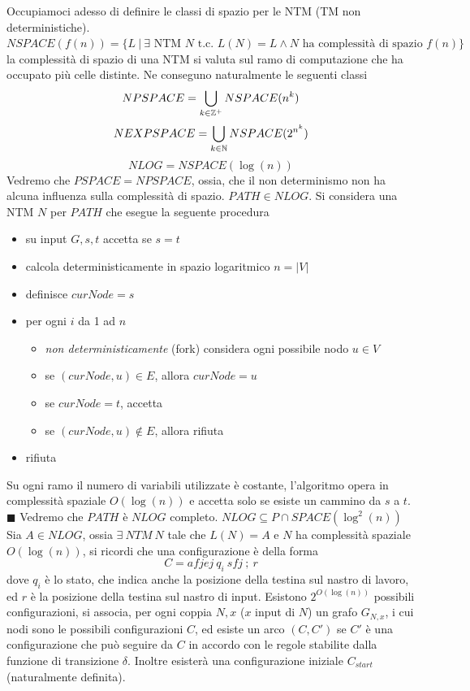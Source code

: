 \documentclass[10pt, letterpaper]{report}
\begin{document}
Occupiamoci adesso di definire le classi di spazio per le NTM (TM non deterministiche). \acc 
{} $NSPACE(f(n))=\{L \ | \ \exists \text{ NTM } N \text{ t.c. } L(N)=L \land N \text{ ha complessità di spazio } f(n)\}$\acc 
la complessità di spazio di una NTM si valuta sul ramo di computazione che ha occupato più celle distinte. Ne conseguno naturalmente le seguenti classi 
$$ NPSPACE=\bigcup_{k\in {\mathbb Z}^+}NSPACE(n^k)$$
$$ NEXPSPACE=\bigcup_{k\in {\mathbb N}}NSPACE(2^{n^k})$$
$$ NLOG=NSPACE(\log(n))$$
Vedremo che $PSPACE=NPSPACE$, ossia, che il non determinismo non ha alcuna influenza sulla complessità di spazio.\acc 
\teo{}  $PATH\in NLOG$.\acc 
\dimo{} Si considera una NTM $N$ per $PATH$ che esegue la seguente procedura\begin{itemize}
    \item su input $G,s,t$ accetta se $s=t$
    \item calcola deterministicamente in spazio logaritmico $n=|V|$
    \item definisce $curNode=s$
    \item per ogni $i$ da 1 ad $n$\begin{itemize}
        \item \textit{non deterministicamente} (fork) considera ogni possibile nodo $u\in V$
        \item se $(curNode,u)\in E$, allora $curNode=u$
        \item se $curNode=t$, accetta 
        \item se $(curNode,u)\notin E$, allora rifiuta
    \end{itemize}
    \item rifiuta 
 \end{itemize}
 Su ogni ramo il numero di variabili utilizzate è costante, l'algoritmo opera in complessità spaziale $O(\log(n))$ e accetta solo se esiste un cammino da $s$ a $t$.
\hfill$\blacksquare$\acc  
Vedremo che $PATH$ è $NLOG$ completo.\acc 
{} $NLOG\subseteq P\cap SPACE(\log^2(n))$\acc 
\dimo{} Sia $A\in NLOG$, ossia $\exists \  NTM \ N$ tale che $L(N)=A$ e $N$ ha complessità spaziale $O(\log(n))$, si ricordi che una configurazione è della forma 
$$ C=afjej\ q_i \ sfj \ ;\ r$$
dove $q_i$ è lo stato, che indica anche la posizione della testina sul nastro di lavoro, ed $r$ è la posizione della testina sul nastro di input. Esistono 
$2^{O(\log(n))}$ possibili configurazioni, si associa, per ogni coppia $N,x$ ($x$ input di $N$) un grafo $G_{N,x}$, i cui nodi sono le possibili configurazioni $C$, ed esiste un arco $(C,C')$ se $C'$ è una configurazione che può seguire da $C$ in accordo con le regole stabilite dalla funzione di transizione $\delta$. Inoltre esisterà una configurazione iniziale $C_{start}$ (naturalmente definita). 
\end{document}
